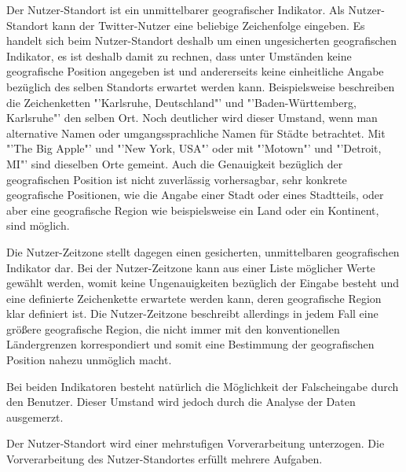 		Der Nutzer-Standort ist ein unmittelbarer geografischer Indikator.  
		Als Nutzer-Standort kann der Twitter-Nutzer eine beliebige Zeichenfolge eingeben. 
		Es handelt sich beim Nutzer-Standort deshalb um einen ungesicherten geografischen Indikator, es ist deshalb damit zu rechnen, dass unter Umständen keine geografische Position angegeben ist und andererseits keine einheitliche Angabe bezüglich des selben Standorts erwartet werden kann.
		Beispielsweise beschreiben die Zeichenketten "'Karlsruhe, Deutschland"' und "'Baden-Württemberg, Karlsruhe"' den selben Ort.
		Noch deutlicher wird dieser Umstand, wenn man alternative Namen oder umgangssprachliche Namen für Städte betrachtet. 
		Mit "'The Big Apple"' und "'New York, USA"' oder mit "'Motown"' und "'Detroit, MI"' sind dieselben Orte gemeint.   
		Auch die Genauigkeit bezüglich der geografischen Position ist nicht zuverlässig vorhersagbar, sehr konkrete geografische Positionen, wie die Angabe einer Stadt oder eines Stadtteils, oder aber eine geografische Region wie beispielsweise ein Land oder ein Kontinent, sind möglich. 

		Die Nutzer-Zeitzone stellt dagegen einen gesicherten, unmittelbaren geografischen Indikator dar.
		Bei der Nutzer-Zeitzone kann aus einer Liste möglicher Werte gewählt werden, womit keine Ungenauigkeiten bezüglich der Eingabe besteht und eine definierte Zeichenkette erwartete werden kann, deren geografische Region klar definiert ist. 
		Die Nutzer-Zeitzone beschreibt allerdings in jedem Fall eine größere geografische Region, die nicht immer mit den konventionellen Ländergrenzen korrespondiert und somit eine Bestimmung der geografischen Position nahezu unmöglich macht.

		Bei beiden Indikatoren besteht natürlich die Möglichkeit der Falscheingabe durch den Benutzer. Dieser Umstand wird jedoch durch die Analyse der Daten ausgemerzt.  


		Der Nutzer-Standort wird einer mehrstufigen Vorverarbeitung unterzogen.
		Die Vorverarbeitung des Nutzer-Standortes erfüllt mehrere Aufgaben. 

